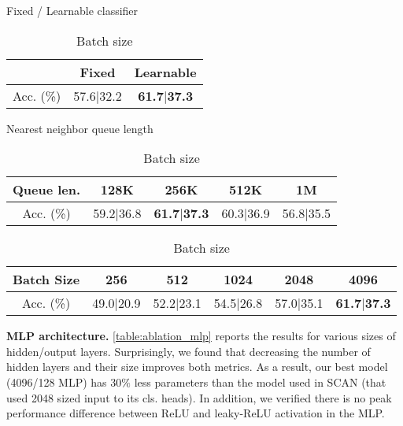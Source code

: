 \documentclass[runningheads]{llncs}
\begin{document}
\begin{table}[!htb]
    \begin{subtable}{.38\linewidth}
      \centering
        \caption{Fixed / Learnable classifier}
        \label{table:fixes_vs_learnable}
        \begin{tabular}{c|cc}
        \toprule
         & Fixed & Learnable \\
        \midrule
        Acc. (\%) & 57.6$\vert$32.2 & \textbf{61.7}$\vert$\textbf{37.3} \\
        \bottomrule
        \end{tabular}
    \end{subtable}\hfill \begin{subtable}{.62\linewidth}
      \centering
        \caption{Nearest neighbor queue length}
        \label{table:ablation_nn_q_len}
        \begin{tabular}{c|cccc}
        \toprule
        Queue len. & 128K & 256K & 512K & 1M \\
        \midrule
        Acc. (\%) & 59.2$\vert$36.8 & \textbf{61.7}$\vert$\textbf{37.3} & 60.3$\vert$36.9 & 56.8$\vert$35.5 \\
        \bottomrule
        \end{tabular}
    \end{subtable} 
    
        \begin{subtable}{\linewidth}
      \centering
        \caption{Batch size}
        \label{table:ablation_batch_size}
        \begin{tabular}{c|ccccc}
        \toprule
        Batch Size & 256 & 512 & 1024 & 2048 & 4096 \\
        \midrule
        Acc. (\%) & 49.0$\vert$20.9 & 52.2$\vert$23.1 & 54.5$\vert$26.8 & 57.0$\vert$35.1 & \textbf{61.7}$\vert$\textbf{37.3} \\
        \bottomrule
        \end{tabular}
    \end{subtable}
    
\end{table}

\textbf{MLP architecture.} \cref{table:ablation_mlp} reports the results for various sizes of hidden/output layers. Surprisingly, we found that decreasing the number of hidden layers and their size improves both metrics. As a result, our best model (4096/128 MLP) has $30\%$ less parameters than the model used in SCAN \cite{van2020scan} (that used 2048 sized input to its cls. heads). In addition, we verified there is no peak performance difference between ReLU and leaky-ReLU activation in the MLP.
\end{document}
